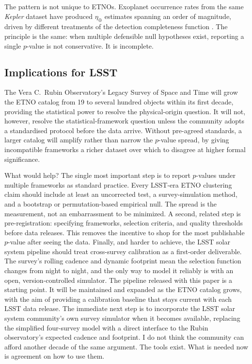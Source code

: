 \documentclass{aa}
\begin{document}
The pattern is not unique to ETNOs. Exoplanet occurrence rates from the same \textit{Kepler} dataset have produced $\eta_\oplus$ estimates spanning an order of magnitude, driven by different treatments of the detection completeness function \citep{bryson2021}. The principle is the same: when multiple defensible null hypotheses exist, reporting a single $p$-value is not conservative. It is incomplete.

\subsection{Implications for LSST}

The Vera C.\ Rubin Observatory's Legacy Survey of Space and Time will grow the ETNO catalog from 19 to several hundred objects within its first decade, providing the statistical power to resolve the physical-origin question. It will not, however, resolve the statistical-framework question unless the community adopts a standardised protocol before the data arrive. Without pre-agreed standards, a larger catalog will amplify rather than narrow the $p$-value spread, by giving incompatible frameworks a richer dataset over which to disagree at higher formal significance.

What would help? The single most important step is to report $p$-values under multiple frameworks as standard practice. Every LSST-era ETNO clustering claim should include at least an uncorrected test, a survey-simulation method, and a bootstrap or permutation-based empirical null. The spread is the measurement, not an embarrassment to be minimized. A second, related step is pre-registration: specifying frameworks, selection criteria, and quality thresholds before data releases. This removes the incentive to shop for the most publishable $p$-value after seeing the data. Finally, and harder to achieve, the LSST solar system pipeline should treat cross-survey calibration as a first-order deliverable. The survey's rolling cadence and dynamic footprint mean the selection function changes from night to night, and the only way to model it reliably is with an open, version-controlled simulator. The pipeline released with this paper is a starting point. It will be maintained and expanded as the ETNO catalog grows, with the aim of providing a calibration baseline that stays current with each LSST data release. The immediate next step is to incorporate the LSST solar system community's own survey simulator when it becomes available, replacing the simplified four-survey model with a direct interface to the Rubin observatory's expected cadence and footprint. I do not think the community can afford another decade of the same argument. The tools exist. What is needed now is agreement on how to use them.
\end{document}
